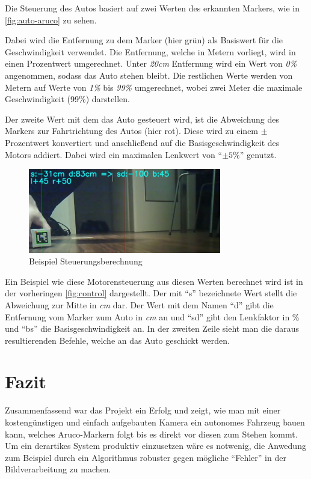 \documentclass{article}
\begin{document}
Die Steuerung des Autos basiert auf zwei Werten des erkannten Markers, wie in \autoref{fig:auto-aruco} zu sehen.

Dabei wird die Entfernung
zu dem Marker (hier grün) als Basiswert für die Geschwindigkeit verwendet. Die Entfernung, welche in Metern vorliegt, wird in einen Prozentwert
umgerechnet. Unter \textit{20cm} Entfernung wird ein Wert von \textit{0\%} angenommen, sodass das Auto stehen bleibt.
Die restlichen Werte werden von Metern auf Werte von \textit{1\%} bis \textit{99\%} umgerechnet,
wobei zwei Meter die maximale Geschwindigkeit (99\%) darstellen.

Der zweite Wert mit dem das Auto gesteuert wird, ist die Abweichung des Markers zur Fahrtrichtung des Autos (hier rot).
Diese wird zu einem $\pm$ Prozentwert konvertiert und anschließend auf die Basisgeschwindigkeit des Motors addiert.
Dabei wird ein maximalen Lenkwert von \enquote{$\pm 5\%$} genutzt.

\begin{figure}[H]
  \begin{center}
    \includegraphics[width=0.75\textwidth]{control}
    \caption{Beispiel Steuerungsberechnung}
    \label{fig:control}
  \end{center}
\end{figure}

Ein Beispiel wie diese Motorensteuerung aus diesen Werten berechnet wird ist in der vorheringen \autoref{fig:control} dargestellt.
Der mit \enquote{s} bezeichnete Wert stellt die Abweichung zur Mitte in \textit{cm} dar. Der Wert mit dem Namen \enquote{d} gibt die
Entfernung vom Marker zum Auto in \textit{cm} an und \enquote{sd} gibt den Lenkfaktor in \% und \enquote{bs} die Basisgeschwindigkeit an.
In der zweiten Zeile sieht man die daraus resultierenden Befehle, welche an das Auto geschickt werden.

\section{Fazit}

Zusammenfassend war das Projekt ein Erfolg und zeigt, wie man mit einer kostengünstigen und einfach aufgebauten Kamera ein autonomes Fahrzeug
bauen kann, welches Aruco-Markern folgt bis es direkt vor diesen zum Stehen kommt.
Um ein derartikes System produktiv einzusetzen wäre es notwenig, die Anwedung zum Beispiel durch ein Algorithmus robuster gegen
mögliche \enquote{Fehler} in der Bildverarbeitung zu machen.
\end{document}
